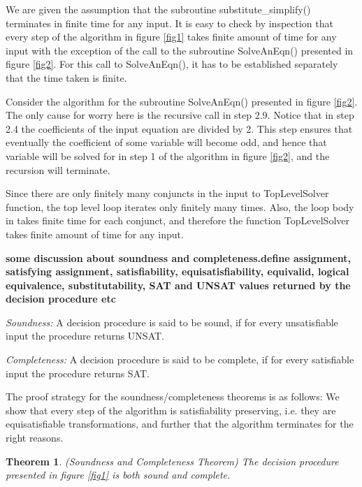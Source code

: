 \documentclass{article}
\newtheorem{theorem}{Theorem}[section]
\newenvironment{proof}[1][Proof]{\begin{trivlist}
\item[\hskip \labelsep {\bfseries #1}]}{\end{trivlist}}
\newenvironment{definition}[1][Definition]{\begin{trivlist}
\item[\hskip \labelsep {\bfseries #1}]}{\end{trivlist}}
\newcommand{\qed}{\nobreak \ifvmode \relax \else
  \ifdim\lastskip<1.5em \hskip-\lastskip
  \hskip1.5em plus0em minus0.5em \fi \nobreak
  \vrule height0.75em width0.5em depth0.25em\fi}
\begin{document}
\begin{proof}
We are given the assumption that the subroutine substitute\_simplify()
terminates in finite time for any input. It is easy to check by
inspection that every step of the algorithm in figure \ref{fig1} takes
finite amount of time for any input with the exception of the call to
the subroutine SolveAnEqn() presented in figure \ref{fig2}. For this
call to SolveAnEqn(), it has to be established separately that the time
taken is finite.

Consider the algorithm for the subroutine SolveAnEqn() presented in
figure \ref{fig2}. The only cause for worry here is the recursive call
in step 2.9. Notice that in step 2.4 the coefficients of the input
equation are divided by 2. This step ensures that eventually the
coefficient of some variable will become odd, and hence that variable
will be solved for in step 1 of the algorithm in figure \ref{fig2},
and the recursion will terminate.

Since there are only finitely many conjuncts in the input to
TopLevelSolver function, the top level loop iterates only finitely
many times. Also, the loop body in takes finite time for each
conjunct, and therefore the function TopLevelSolver takes finite
amount of time for any input. \qed
\end{proof}

\textbf{some discussion about soundness and completeness.define
assignment, satisfying assignment, satisfiability, equisatisfiability,
equivalid, logical equivalence, substitutability, SAT and UNSAT values
returned by the decision procedure etc}


\begin{definition}
\item \emph{Soundness:} A decision procedure is said to be sound, if
for every unsatisfiable input the procedure returns UNSAT.

\item \emph{Completeness:} A decision procedure is said to be
complete, if for every satisfiable input the procedure returns SAT.
\end{definition}

The proof strategy for the soundness/completeness theorems is as
follows: We show that every step of the algorithm is satisfiability
preserving, i.e. they are equisatisfiable transformations, and further
that the algorithm terminates for the right reasons.

\begin{theorem}
\emph{(Soundness and Completeness Theorem)}
\label{SoundComplete}
The decision procedure presented in figure \ref{fig1} is both sound
and complete.
\end{theorem}
\end{document}
